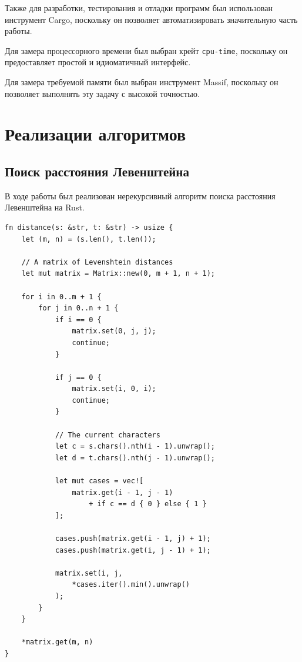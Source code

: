 \documentclass{report}
\begin{document}
Также для разработки, тестирования и отладки программ был
использован инструмент Cargo, поскольку он позволяет
автоматизировать значительную часть работы.

Для замера процессорного времени был выбран крейт
\texttt{cpu-time}, поскольку он предоставляет простой и
идиоматичный интерфейс.

Для замера требуемой памяти был выбран инструмент Massif,
поскольку он позволяет выполнять эту задачу с высокой точностью.

\section{Реализации алгоритмов}

\subsection{Поиск расстояния Левенштейна}

В ходе работы был реализован нерекурсивный алгоритм поиска
расстояния Левенштейна на Rust.

\begin{lstlisting}[caption=Реализация нерекурсивного алгоритма]
fn distance(s: &str, t: &str) -> usize {
    let (m, n) = (s.len(), t.len());

    // A matrix of Levenshtein distances
    let mut matrix = Matrix::new(0, m + 1, n + 1);

    for i in 0..m + 1 {
        for j in 0..n + 1 {
            if i == 0 {
                matrix.set(0, j, j);
                continue;
            }

            if j == 0 {
                matrix.set(i, 0, i);
                continue;
            }

            // The current characters
            let c = s.chars().nth(i - 1).unwrap();
            let d = t.chars().nth(j - 1).unwrap();

            let mut cases = vec![
                matrix.get(i - 1, j - 1)
                    + if c == d { 0 } else { 1 }
            ];

            cases.push(matrix.get(i - 1, j) + 1);
            cases.push(matrix.get(i, j - 1) + 1);

            matrix.set(i, j,
                *cases.iter().min().unwrap()
            );
        }
    }

    *matrix.get(m, n)
}
\end{lstlisting}
\end{document}
